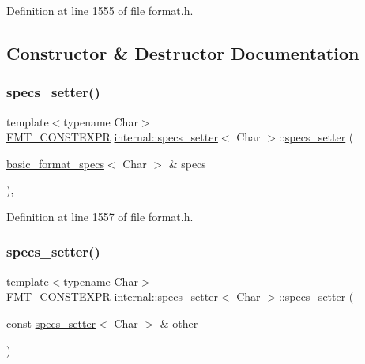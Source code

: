 Definition at line 1555 of file format.\+h.



\subsection{Constructor \& Destructor Documentation}
\mbox{\label{classinternal_1_1specs__setter_a36afda80a8421700e9293a4271bea4ea}} 
\subsubsection{\texorpdfstring{specs\+\_\+setter()}{specs\_setter()}\hspace{0.1cm}{\footnotesize\ttfamily [1/2]}}
{\footnotesize\ttfamily template$<$typename Char$>$ \\
\hyperlink{core_8h_a69201cb276383873487bf68b4ef8b4cd}{F\+M\+T\+\_\+\+C\+O\+N\+S\+T\+E\+X\+PR} \hyperlink{classinternal_1_1specs__setter}{internal\+::specs\+\_\+setter}$<$ Char $>$\+::\hyperlink{classinternal_1_1specs__setter}{specs\+\_\+setter} (\begin{DoxyParamCaption}\item[{\hyperlink{structbasic__format__specs}{basic\+\_\+format\+\_\+specs}$<$ Char $>$ \&}]{specs }\end{DoxyParamCaption})\hspace{0.3cm}{\ttfamily [inline]}, {\ttfamily [explicit]}}



Definition at line 1557 of file format.\+h.

\mbox{\label{classinternal_1_1specs__setter_a2fc19308b1c3c83c5eea29975b12c9b9}} 
\subsubsection{\texorpdfstring{specs\+\_\+setter()}{specs\_setter()}\hspace{0.1cm}{\footnotesize\ttfamily [2/2]}}
{\footnotesize\ttfamily template$<$typename Char$>$ \\
\hyperlink{core_8h_a69201cb276383873487bf68b4ef8b4cd}{F\+M\+T\+\_\+\+C\+O\+N\+S\+T\+E\+X\+PR} \hyperlink{classinternal_1_1specs__setter}{internal\+::specs\+\_\+setter}$<$ Char $>$\+::\hyperlink{classinternal_1_1specs__setter}{specs\+\_\+setter} (\begin{DoxyParamCaption}\item[{const \hyperlink{classinternal_1_1specs__setter}{specs\+\_\+setter}$<$ Char $>$ \&}]{other }\end{DoxyParamCaption})\hspace{0.3cm}{\ttfamily [inline]}}



